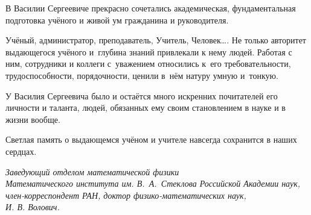 В Василии Сергеевиче прекрасно сочетались академическая, фундаментальная подготовка учёного и живой ум гражданина и руководителя.

Учёный, администратор, преподаватель, Учитель, Человек\dots. Не только авторитет выдающегося учёного
и~глубина знаний привлекали к нему людей. Работая с ним, сотрудники и коллеги с~уважением относились к~его требовательности, трудоспособности, порядочности, ценили в~нём натуру умную и~тонкую.

У Василия Сергеевича было и остаётся много искренних почитателей его личности и 
таланта, людей, обязанных ему своим становлением в науке и в жизни вообще.


Светлая память о выдающемся учёном и учителе навсегда сохранится в наших сердцах.
  
\begin{flushright} \it \footnotesize
Заведующий отделом математической физики\\
Математического института им. В.~А.~Стеклова Российской Академии наук,\\
член-корреспондент РАН, доктор физико-математических наук, \\ И. В. Волович.
 \end{flushright}


\newpage

%
%
